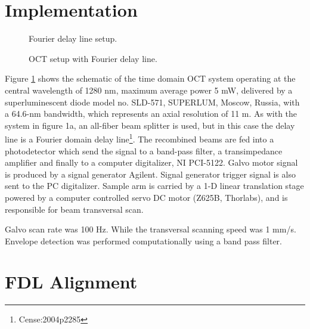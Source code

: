 \documentclass[12pt,twoside,english]{book}
\renewcommand{\~}{\perispomeni}%
\DeclareRobustCommand{\textgreek}[1]{\leavevmode{\greektext #1}}
\numberwithin{equation}{section}
\numberwithin{figure}{section}
\begin{document}
\section{Implementation}

\begin{figure}
\begin{minipage}[t]{0.48\textwidth}

\caption{Fourier delay line setup.}
\label{fig:FDL setup}
\end{minipage}
\hfill
\begin{minipage}[t]{0.48\textwidth}

\caption{OCT setup with Fourier delay line.}
\label{fig:OCTfdl}
\end{minipage}
\end{figure}


Figure \ref{fig:OCTfdl} shows the schematic of the time domain OCT system operating at the central wavelength of 1280 nm, maximum average power 5 mW, delivered by a superluminescent diode model no. SLD-571, SUPERLUM, Moscow, Russia, with a 64.6-nm bandwidth, which represents an axial resolution of 11 \textgreek{m}m. As with the system in figure 1a, an all-fiber beam splitter is used, but in this case the delay line is a Fourier domain delay line\footnote{Cense:2004p2285}. The recombined beams are fed into a photodetector which send the signal to a band-pass filter, a transimpedance amplifier and finally to a computer digitalizer, NI PCI-5122. Galvo motor signal is produced by a signal generator Agilent. Signal generator trigger signal is also sent to the PC digitalizer. Sample arm is carried by a 1-D linear translation stage powered by a computer controlled servo DC motor (Z625B, Thorlabs), and is responsible for beam transversal scan.

Galvo scan rate was 100 Hz. While the transversal scanning speed was 1 mm/s. Envelope detection was performed computationally using a band pass filter.

\section{FDL Alignment}
\end{document}
